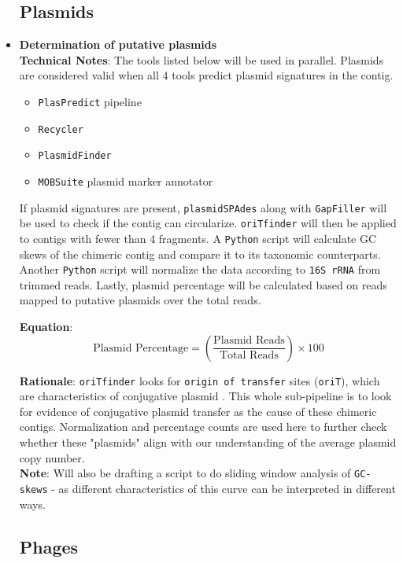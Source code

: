 \documentclass[11pt]{report}
\begin{document}
\begin{itemize}
\subsection*{Plasmids}


	\item \textbf{Determination of putative plasmids}\\
	\textbf{Technical Notes}: The tools listed below will be used in parallel. Plasmids are considered valid when all 4 tools predict plasmid signatures in the contig.
	\begin{itemize}
		\item \texttt{PlasPredict} pipeline
		\item \texttt{Recycler}
		\item \texttt{PlasmidFinder}
		\item \texttt{MOBSuite} plasmid marker annotator
	\end{itemize}
	If plasmid signatures are present, \texttt{plasmidSPAdes} along with \texttt{GapFiller} will be used to check if the contig can circularize. \texttt{oriTfinder} will then be applied to contigs with fewer than 4 fragments. A \texttt{Python} script will calculate GC skews of the chimeric contig and compare it to its taxonomic counterparts. Another \texttt{Python} script will normalize the data according to \texttt{16S rRNA} from trimmed reads. Lastly, plasmid percentage will be calculated based on reads mapped to putative plasmids over the total reads.
	
	\textbf{Equation}:
	\[
	\text{Plasmid Percentage} = \left( \frac{\text{Plasmid Reads}}{\text{Total Reads}} \right) \times 100
	\]

	\textbf{Rationale}: \texttt{oriTfinder} looks for \texttt{origin of transfer} sites (\texttt{oriT}), which are characteristics of conjugative plasmid . This whole sub-pipeline is to look for evidence of conjugative plasmid transfer as the cause of these chimeric contigs. Normalization and percentage counts are used here to further check whether these "plasmids" align with our understanding of the average plasmid copy number. \\
	\textbf{Note}: Will also be drafting a script to do sliding window analysis of \texttt{GC-skews} - as different characteristics of this curve can be interpreted in different ways. 

\subsection*{Phages}		
	

\end{itemize}
\end{document}
